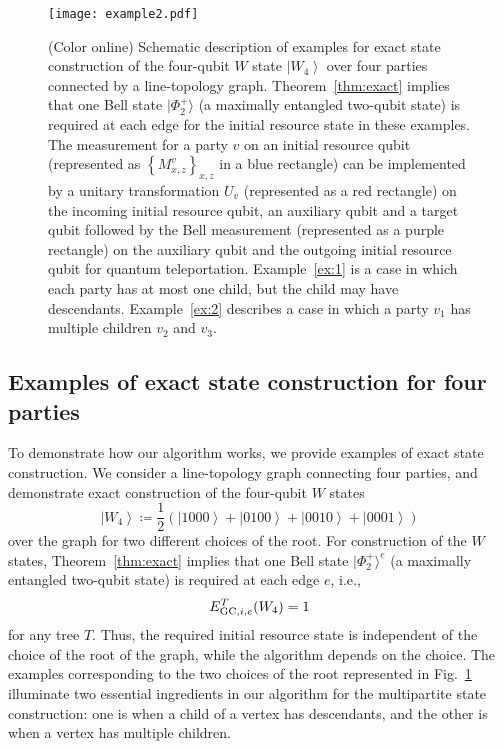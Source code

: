 \documentclass[preprintnumbers,aps,amsmath,amssymb,pra,twocolumn,showpacs,superscriptaddress,floatfix]{revtex4-1}
\def\Ket#1{\left|#1\right\rangle}
\newcommand{\ket}[1]{|{#1}\rangle}
\theoremstyle{plain}
\theoremstyle{definition}
\theoremstyle{remark}
\begin{document}
\begin{figure}
\centering
\texttt{[image: example2.pdf]}
\caption{(Color online) Schematic description of examples for exact state construction of the four-qubit $W$ state $\Ket{W_4}$ over four parties connected by a line-topology graph.  Theorem~\ref{thm:exact} implies that one Bell state $\ket{\Phi^+_2}$ (a maximally entangled two-qubit state) is required at each edge for the initial resource state in these examples.  The measurement for a party $v$ on an initial resource qubit (represented as ${\left\{M^v_{x,z}\right\}}_{x,z}$ in a blue rectangle) can be implemented by a unitary transformation $U_v$ (represented as a red rectangle) on the incoming initial resource qubit, an auxiliary qubit and a target qubit followed by the Bell measurement (represented as a purple rectangle) on the auxiliary qubit and the outgoing initial resource qubit for quantum teleportation.
Example~\ref{ex:1} is a case in which each party has at most one child, but the child may have descendants.
Example~\ref{ex:2} describes a case in which a party $v_1$ has multiple children $v_2$ and $v_3$.}
\label{fig:example}
\end{figure}


\subsection{Examples of exact state construction for four parties}
To demonstrate how our algorithm works, we provide examples of exact state construction.
We consider a line-topology graph connecting four parties,
and demonstrate exact construction of the four-qubit $W$ states 
\[
    \Ket{W_4}\coloneqq\frac{1}{2}\left(\Ket{1000}+\Ket{0100}+\Ket{0010}+\Ket{0001}\right)
\]
over the graph for two different choices of the root.  For construction of the $W$ states,  Theorem~\ref{thm:exact} implies that one Bell state $\ket{\Phi^+_2}^e$ (a maximally entangled two-qubit state) is required at each edge $e$, i.e.,\
\[
  E_{\textup{GC},i,e}^T(W_4) = 1
\]
for any tree $T$.   Thus, the required initial resource state is independent of the choice of the root of the graph, while the algorithm depends on the choice.  The examples corresponding to the two choices of the root represented in Fig.~\ref{fig:example} illuminate two essential ingredients in our algorithm for the multipartite state construction: one is when a child of a vertex has descendants, and the other is when a vertex has multiple children.
\end{document}

